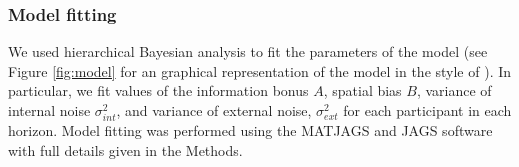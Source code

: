 \documentclass[12pt]{article}
\begin{document}
	\subsubsection*{Model fitting}
	We used hierarchical Bayesian analysis to fit the parameters of the model (see Figure \ref{fig:model} for an graphical representation of the model in the style of \cite{lee2014}). In particular, we fit values of the information bonus $A$, spatial bias $B$, variance of internal noise $\sigma_{int}^2$, and variance of external noise, $\sigma_{ext}^2$ for each participant in each horizon. Model fitting was performed using the MATJAGS and JAGS software \citep{jags, matjags} with full details given in the Methods.   %
	
	
	
	
	
	
\end{document}
